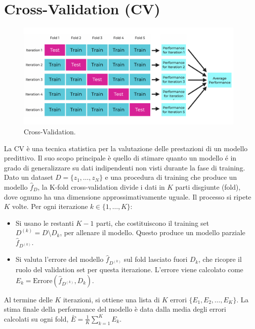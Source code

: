 \documentclass[a4paper,12pt]{report}
\begin{document}
	\section{Cross-Validation (CV)}
	\begin{figure}[H]
		\centering
		\includegraphics[width=1.0\textwidth]{img/cv.png}
		\caption{Cross-Validation.}
	\end{figure}
	La CV è una tecnica statistica per la valutazione delle prestazioni di un modello predittivo. Il suo scopo principale è quello di stimare quanto un modello é in grado di generalizzare su dati indipendenti non visti durante la fase di training. Dato un dataset $D = \{z_1, \dots, z_N\}$ e una procedura di training che produce un modello $\hat f_{D}$, la K-fold cross-validation divide i dati in $K$ parti disgiunte (fold), dove ognuno ha una dimensione approssimativamente uguale. Il processo si ripete $K$ volte. Per ogni iterazione $k \in \{1, \dots, K\}$:
	\begin{itemize}
		\item Si usano le restanti $K-1$ parti, che costituiscono il training set $D^{(k)} = D \setminus D_k$, per allenare il modello. Questo produce un modello parziale $\hat f_{D^{(k)}}$.
		\item Si valuta l'errore del modello $\hat f_{D^{(k)}}$ sul fold lasciato fuori $D_k$, che ricopre il ruolo del validation set per questa iterazione. L'errore viene calcolato come $E_k = \text{Errore}(\hat f_{D^{(k)}}, D_k)$.
	\end{itemize}
	Al termine delle $K$ iterazioni, si ottiene una lista di $K$ errori $\{E_1, E_2, \dots, E_K\}$. La stima finale della performance del modello è data dalla media degli errori calcolati su ogni fold, $\bar{E} = \frac{1}{K} \sum_{k=1}^K E_k$.
	
\end{document}
